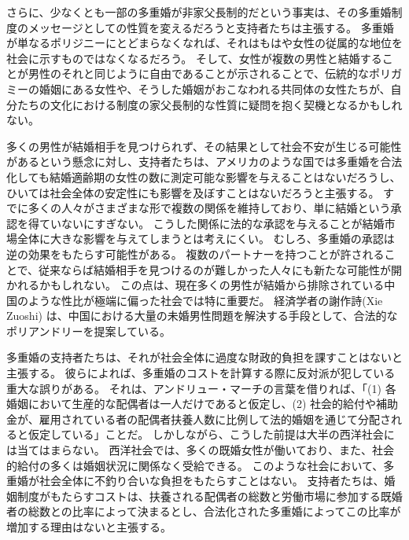 \documentclass[paper=a4,book,openany]{jlreq}
\begin{document}
さらに、少なくとも一部の多重婚が非家父長制的だという事実は、その多重婚制度のメッセージとしての性質を変えるだろうと支持者たちは主張する。
多重婚が単なるポリジニーにとどまらなくなれば、それはもはや女性の従属的な地位を社会に示すものではなくなるだろう。
そして、女性が複数の男性と結婚することが男性のそれと同じように自由であることが示されることで、伝統的なポリガミーの婚姻にある女性や、そうした婚姻がおこなわれる共同体の女性たちが、自分たちの文化における制度の家父長制的な性質に疑問を抱く契機となるかもしれない。

多くの男性が結婚相手を見つけられず、その結果として社会不安が生じる可能性があるという懸念に対し、支持者たちは、アメリカのような国では多重婚を合法化しても結婚適齢期の女性の数に測定可能な影響を与えることはないだろうし、ひいては社会全体の安定性にも影響を及ぼすことはないだろうと主張する。
すでに多くの人々がさまざまな形で複数の関係を維持しており、単に結婚という承認を得ていないにすぎない。
こうした関係に法的な承認を与えることが結婚市場全体に大きな影響を与えてしまうとは考えにくい。
むしろ、多重婚の承認は逆の効果をもたらす可能性がある。
複数のパートナーを持つことが許されることで、従来ならば結婚相手を見つけるのが難しかった人々にも新たな可能性が開かれるかもしれない。
この点は、現在多くの男性が結婚から排除されている中国のような性比が極端に偏った社会では特に重要だ。
経済学者の謝作詩(Xie Zuoshi) は、中国における大量の未婚男性問題を解決する手段として、合法的なポリアンドリーを提案している\citep{weller15:_econom_has_contr_solut_china}。

多重婚の支持者たちは、それが社会全体に過度な財政的負担を課すことはないと主張する。
彼らによれば、多重婚のコストを計算する際に反対派が犯している重大な誤りがある。
それは、アンドリュー・マーチの言葉を借りれば、「(1) 各婚姻において生産的な配偶者は一人だけであると仮定し、(2) 社会的給付や補助金が、雇用されている者の配偶者扶養人数に比例して法的婚姻を通じて分配されると仮定している」ことだ\citep[p.268]{march11:_is_there_right_polyg}。
しかしながら、こうした前提は大半の西洋社会には当てはまらない。
西洋社会では、多くの既婚女性が働いており、また、社会的給付の多くは婚姻状況に関係なく受給できる。
このような社会において、多重婚が社会全体に不釣り合いな負担をもたらすことはない。
支持者たちは、婚姻制度がもたらすコストは、扶養される配偶者の総数と労働市場に参加する既婚者の総数との比率によって決まるとし、合法化された多重婚によってこの比率が増加する理由はないと主張する。
\end{document}
